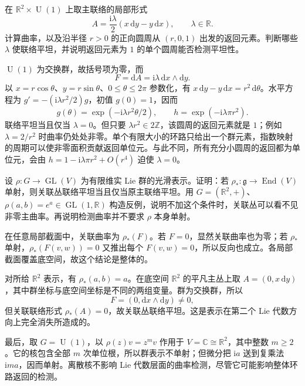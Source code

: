 \begin{exercise}\label{g1:ex:circle-area-principal-holonomy}
	在 \(\mathbb R^2\times\operatorname{U}(1)\) 上取主联络的局部形式
	\[
		A=\frac{\mathrm i\lambda}{2}(x\,\mathrm{d}y-y\,\mathrm{d}x),\qquad \lambda\in\mathbb R.
	\]
	计算曲率，以及沿半径 \(r>0\) 的正向圆周从 \((r,0,1)\) 出发的返回元素。判断哪些 \(\lambda\) 使联络平坦，并说明返回元素为 \(1\) 的单个圆周能否检测平坦性。
\end{exercise}
\begin{solution}
	\(\operatorname{U}(1)\) 为交换群，故括号项为零，而
	\[
		F=\mathrm{d}A=\mathrm i\lambda\,\mathrm{d}x\wedge\mathrm{d}y.
	\]
	以 \(x=r\cos\theta\)、\(y=r\sin\theta\)、\(0\le\theta\le2\pi\) 参数化，有 \(x\,\mathrm{d}y-y\,\mathrm{d}x=r^2\,\mathrm{d}\theta\)。水平方程为 \(g'=-(\mathrm i\lambda r^2/2)g\)，初值 \(g(0)=1\)，因而
	\[
		g(\theta)=\exp(-\mathrm i\lambda r^2\theta/2),\qquad
		h=\exp(-\mathrm i\lambda\pi r^2).
	\]
	联络平坦当且仅当 \(\lambda=0\)。但只要 \(\lambda r^2\in2\mathbb Z\)，该圆周的返回元素就是 \(1\)；例如 \(\lambda=2/r^2\) 时曲率仍处处非零。单个有限大小的环路只给出一个群元素，指数映射的周期可以使非零面积贡献返回单位元。与此不同，所有充分小圆周的返回都为单位元，会由 \(h=1-\mathrm i\lambda\pi r^2+O(r^4)\) 迫使 \(\lambda=0\)。
\end{solution}

\begin{exercise}\label{g1:ex:associated-curvature-detection}
	设 \(\rho:G\to\operatorname{GL}(V)\) 为有限维实 Lie 群的光滑表示。证明：若 \(\rho_*:\mathfrak g\to\operatorname{End}(V)\) 单射，则关联丛联络平坦当且仅当原主联络平坦。用 \(G=(\mathbb R^2,+)\)、\(\rho(a,b)=e^a\in\operatorname{GL}(1,\mathbb R)\) 构造反例，说明不加这个条件时，关联丛可以看不见非零主曲率。再说明检测曲率并不要求 \(\rho\) 本身单射。
\end{exercise}
\begin{solution}
	在任意局部截面中，关联曲率为 \(\rho_*(F)\)。若 \(F=0\)，显然关联曲率也为零；若 \(\rho_*\) 单射，\(\rho_*(F(v,w))=0\) 又推出每个 \(F(v,w)=0\)，所以反向也成立。各局部截面覆盖底空间，故这个结论是整体的。

	对所给 \(\mathbb R^2\) 表示，有 \(\rho_*(a,b)=a\)。在底空间 \(\mathbb R^2\) 的平凡主丛上取 \(A=(0,x\,\mathrm{d}y)\)，其中群坐标与底空间坐标是不同的两组变量。群为交换群，所以
	\[
		F=(0,\mathrm{d}x\wedge\mathrm{d}y)\ne0,
	\]
	但关联联络形式 \(\rho_*(A)=0\)，故关联丛联络平坦。这是表示在第二个 Lie 代数方向上完全消失所造成的。

	最后，取 \(G=\operatorname{U}(1)\)，以 \(\rho(z)v=z^m v\) 作用于 \(V=\mathbb C\cong\mathbb R^2\)，其中整数 \(m\ge2\)。它的核包含全部 \(m\) 次单位根，所以群表示不单射；但微分把 \(\mathrm i a\) 送到复乘法 \(\mathrm i m a\)，因而单射。离散核不影响 Lie 代数层面的曲率检测，尽管它可能影响整体环路返回的检测。
\end{solution}

